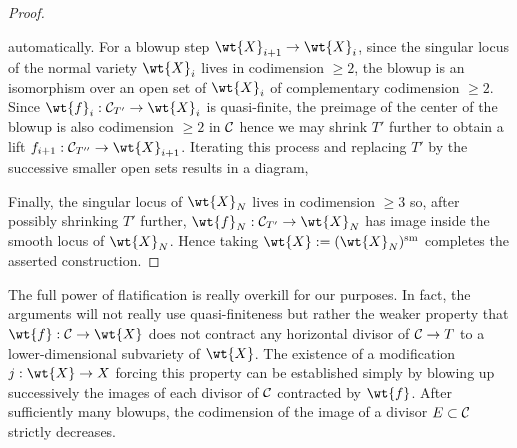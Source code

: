 \documentclass[main.tex]{subfiles}
\begin{document}
\begin{proof}
\begin{center}
\end{center}
automatically. For a blowup step $\wt{X}_{i+1} \to \wt{X}_i$, since the singular locus of the normal variety $\wt{X}_i$ lives in codimension $\ge 2$, the blowup is an isomorphism over an open set of $\wt{X}_i$ of complementary codimension $\ge 2$. Since $\wt{f}_i : \cC_{T'} \to \wt{X}_i$ is quasi-finite, the preimage of the center of the blowup is also codimension $\ge 2$ in $\mathcal{C}$ hence we may shrink $T'$ further to obtain a lift $f_{i+1} : \cC_{T''} \to \wt{X}_{i+1}$. Iterating this process and replacing $T'$ by the successive smaller open sets results in a diagram,
\begin{center}
\end{center}
Finally, the singular locus of $\wt{X}_N$ lives in codimension $\ge 3$ so, after possibly shrinking $T'$ further, $\wt{f}_N : \cC_{T'} \to \wt{X}_N$ has image inside the smooth locus of $\wt{X}_N$. Hence taking $\wt{X} := (\wt{X}_N)^{\smooth}$ completes the asserted construction. 
\end{proof}

\begin{rmk}
The full power of flatification is really overkill for our purposes. In fact, the arguments will not really use quasi-finiteness but rather the weaker property that $\wt{f} : \cC \to \wt{X}$ does not contract any horizontal divisor of $\mathcal{C} \to T$ to a lower-dimensional subvariety of $\wt{X}$. The existence of a modification $j : \wt{X} \to X$ forcing this property can be established simply by blowing up successively the images of each divisor of $\mathcal{C}$ contracted by $\wt{f}$. After sufficiently many blowups, the codimension of the image of a divisor $E \subset \mathcal{C}$ strictly decreases. 
\end{rmk}
\end{document}
